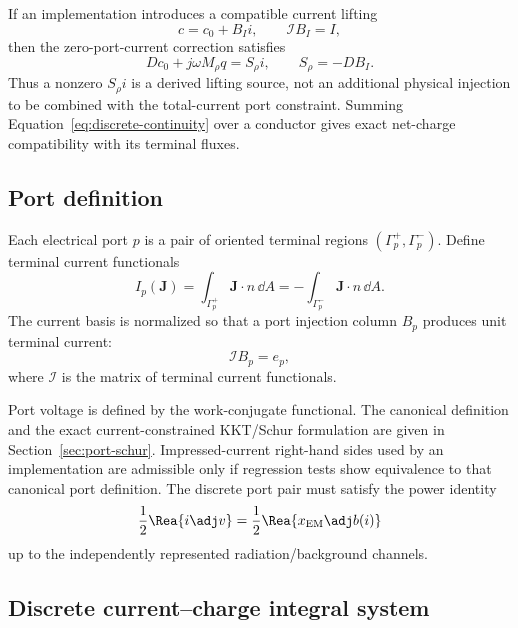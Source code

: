 If an implementation introduces a compatible current lifting
\[
  c=c_0+B_I i,\qquad \mathcal I B_I=I,
\]
then the zero-port-current correction satisfies
\[
  Dc_0+j\omega M_\rho q
  =S_\rho i,
  \qquad
  S_\rho=-DB_I.
\]
Thus a nonzero $S_\rho i$ is a derived lifting source, not an additional
physical injection to be combined with the total-current port constraint.
Summing Equation~\eqref{eq:discrete-continuity} over a conductor gives exact
net-charge compatibility with its terminal fluxes.

\subsection{Port definition}

Each electrical port $p$ is a pair of oriented terminal regions
$(\Gamma_p^+,\Gamma_p^-)$. Define terminal current functionals
\[
 I_p(\mathbf J)
 =
 \int_{\Gamma_p^+}\mathbf J\cdot n\,\dd A
 =
 -\int_{\Gamma_p^-}\mathbf J\cdot n\,\dd A .
\]
The current basis is normalized so that a port injection column $B_p$ produces
unit terminal current:
\[
  \mathcal I B_p=e_p,
\]
where $\mathcal I$ is the matrix of terminal current functionals.

Port voltage is defined by the work-conjugate functional. The canonical
definition and the exact current-constrained KKT/Schur formulation are given in
Section~\ref{sec:port-schur}. Impressed-current right-hand sides used by an
implementation are admissible only if regression tests show equivalence to that
canonical port definition. The discrete port pair must satisfy the power identity
\[
  \frac12\Rea\{i\adj v\}
  =
  \frac12\Rea\{x_{\rm EM}\adj b(i)\}
\]
up to the independently represented radiation/background channels.

\subsection{Discrete current--charge integral system}

